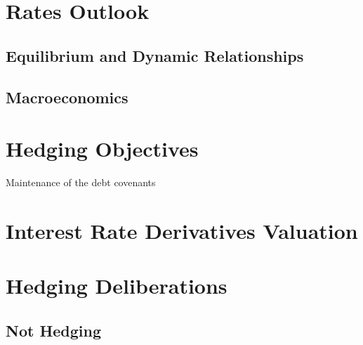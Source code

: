 \documentclass[11pt, a4paper, british]{article}
\begin{document}
\newpage
\section{Rates Outlook}

\subsection{Equilibrium and Dynamic Relationships}

\subsection{Macroeconomics}

\newpage

\section{Hedging Objectives}

Maintenance of the debt covenants 

\newpage

\section{Interest Rate Derivatives Valuation}


\newpage

\section{Hedging Deliberations}


\newpage

\subsection{Not Hedging}
\end{document}

